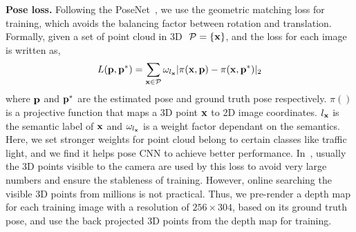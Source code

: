 \textbf{Pose loss.}
Following the PoseNet~\cite{kendall2017geometric}, we use the geometric matching loss for training, which avoids the balancing factor between rotation and translation.
Formally, given a set of point cloud in 3D $~{\mathcal P}=\{{\mathbf x}\}$, and the loss for each image is written as,
\begin{align}
L({\mathbf p}, {\mathbf p}^*) = \sum_{{\mathbf x} \in {\mathcal P}}\omega_{l_{\mathbf x}}|\pi({\mathbf x}, {\mathbf p}) - \pi({\mathbf x}, {\mathbf p}^*)|_2
\label{eq:proj_loss}
\end{align}
where ${\mathbf p}$ and ${\mathbf p}^*$ are the estimated pose and ground truth pose respectively. $\pi()$ is a projective function that maps a 3D point ${\mathbf x}$ to 2D image coordinates. $l_{\mathbf x}$ is the semantic label of ${\mathbf x}$ and $\omega_{l_{\mathbf x}}$ is a weight factor dependant on the semantics. Here, we set stronger weights for point cloud belong to certain classes like traffic light, and we find it helps pose CNN to achieve better performance.
In~\cite{kendall2017geometric}, usually the 3D points visible to the camera are used by this loss to avoid very large numbers and ensure the stableness of training. However, online searching the visible 3D points from millions is not practical.
Thus, we pre-render a depth map for each training image with a resolution of $256 \times 304$, based on its ground truth pose, and use the back projected 3D points from the depth map for training.

